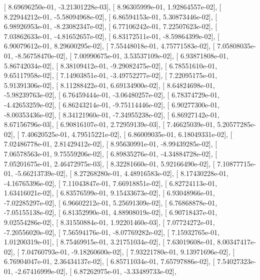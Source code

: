 \documentclass{article}
\begin{document}
       [  8.69696250e-01,  -3.21301228e-03],
       [  8.96305999e-01,   1.92864557e-02],
       [  8.22944212e-01,  -5.58094968e-02],
       [  6.86594153e-01,   5.30873446e-02],
       [  6.98926953e-01,  -8.23082347e-02],
       [  6.77106242e-01,   7.22507623e-02],
       [  7.03862633e-01,  -4.81652657e-02],
       [  6.83172511e-01,  -8.59864399e-02],
       [  6.90079612e-01,   8.29600295e-02],
       [  7.55448018e-01,   4.75771583e-02],
       [  7.05808035e-01,  -8.56758470e-02],
       [  7.00990675e-01,   3.53537109e-02],
       [  6.93871808e-01,   5.86742034e-02],
       [  8.38109412e-01,  -9.29082475e-02],
       [  6.78551610e-01,   9.65117958e-02],
       [  7.14903851e-01,  -3.49752277e-02],
       [  7.22095175e-01,   5.91391306e-02],
       [  8.11288422e-01,   6.69134900e-02],
       [  8.64824698e-01,  -5.98239763e-02],
       [  6.76459444e-01,  -3.06480257e-02],
       [  6.78374729e-01,  -4.42653259e-02],
       [  6.86243214e-01,  -9.75114446e-02],
       [  6.90277300e-01,  -8.00353436e-02],
       [  8.34121960e-01,  -7.34955238e-02],
       [  6.86927142e-01,   8.67156796e-03],
       [  6.90816107e-01,   2.72959139e-03],
       [  7.46625039e-01,   5.20577285e-02],
       [  7.40620525e-01,   4.79515221e-02],
       [  6.86009035e-01,   6.18049331e-02],
       [  7.02486778e-01,   2.81429412e-02],
       [  8.95630991e-01,  -8.99439285e-02],
       [  7.06578563e-01,   9.75559206e-02],
       [  6.89835276e-01,  -4.34884728e-02],
       [  7.05201675e-01,   2.46472975e-03],
       [  8.32281660e-01,   5.92166490e-02],
       [  7.10877715e-01,  -5.66213739e-02],
       [  8.27268280e-01,   4.48916583e-02],
       [  8.17430228e-01,  -4.16765396e-02],
       [  7.11043847e-01,   7.66918851e-02],
       [  6.82724113e-01,   1.63416021e-02],
       [  6.83576599e-01,   9.15433673e-02],
       [  6.93048966e-01,  -7.02285297e-02],
       [  6.96602212e-01,   5.25691309e-02],
       [  6.76868878e-01,  -7.05155138e-02],
       [  6.81352990e-01,   4.88908019e-02],
       [  6.90718437e-01,   9.02554286e-02],
       [  8.31550884e-01,   1.92201460e-03],
       [  7.07724272e-01,  -7.20556020e-02],
       [  7.56594176e-01,  -8.07769282e-02],
       [  7.15932765e-01,   1.01200319e-01],
       [  8.75469915e-01,   3.21751034e-02],
       [  7.63019608e-01,   8.00347417e-02],
       [  7.04760793e-01,  -9.18260600e-02],
       [  7.93221780e-01,   9.13971696e-02],
       [  6.76904047e-01,   2.36434137e-02],
       [  6.85711034e-01,   7.65797886e-02],
       [  7.54027323e-01,  -2.67416999e-02],
       [  6.87262975e-01,  -3.33489733e-02],
\end{document}
